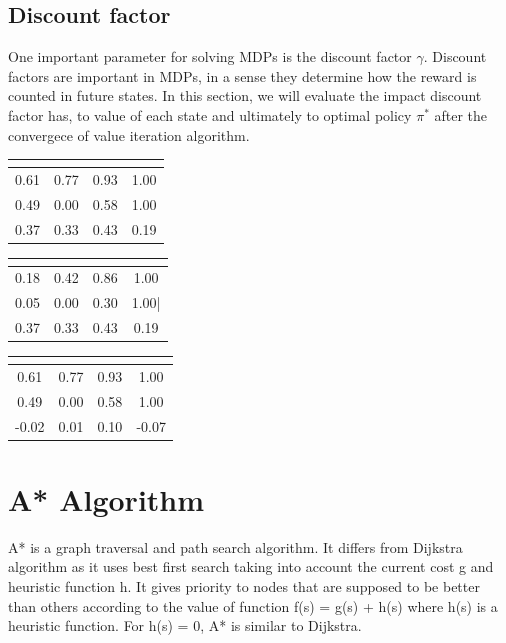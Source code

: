 \documentclass[10pt,a4paper,twocolumn]{article}
\begin{document}
	
	\subsection{Discount factor}
	 One  important parameter for solving  MDPs is the discount factor $\gamma$. Discount factors are important in MDPs, in a sense they determine how the reward is counted in future states.
	 In this section, we will evaluate the impact discount factor has, to value of each state and ultimately to optimal policy $\pi^{*} $ after the convergece of value iteration algorithm.
	 
	\begin{center}
		\begin{tabular}{ c c c c}
			 \hline
			\multicolumn{4}{|c|}{  \text{$\gamma = 0.9$} } \\
			\hline
			0.61  & 0.77  & 0.93 & 1.00 \\ 
			0.49  & 0.00  & 0.58  & 1.00 \\  
			0.37 &  0.33 & 0.43 & 0.19    
		\end{tabular}
	\end{center}
	
	
		\begin{center}
		\begin{tabular}{ c c c c}
						 \hline
			\multicolumn{4}{|c|}{  \text{$\gamma = 0.6$} } \\
			\hline
			0.18 & 0.42 & 0.86 &1.00 \\ 
			0.05 & 0.00 & 0.30 & 1.00|  \\  
			0.37 &  0.33 & 0.43 & 0.19    
		\end{tabular}
	\end{center}


	\begin{center}
	\begin{tabular}{ c c c c}
					 \hline
		\multicolumn{4}{|c|}{  \text{$\gamma = 0.2$} } \\
		\hline
		0.61  & 0.77  & 0.93 & 1.00 \\ 
		0.49  & 0.00  & 0.58  & 1.00 \\  
		-0.02 & 0.01 &  0.10 & -0.07
	\end{tabular}
\end{center}




	\section{A* Algorithm}
	A* is a graph traversal and path search algorithm. It differs from Dijkstra algorithm as it uses best first search taking into account the current cost g and heuristic function h. It gives priority to nodes that are supposed to be better than others according to the value of function f(s) = g(s) + h(s) where h(s) is a heuristic function. For h(s) = 0, A* is similar to Dijkstra.
	
\end{document}
